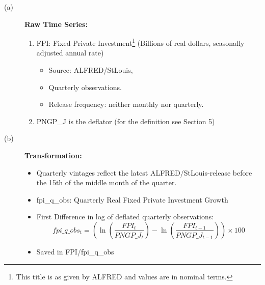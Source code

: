 \documentclass[3p,review,times]{elsarticle}		%
\begin{document}
\begin{description}
	\item[(a)] \textbf{Raw Time Series:}
	\begin{enumerate}
		\item FPI: Fixed Private Investment\footnote{This title is as given by ALFRED and values are in nominal terms.} (Billions of real dollars, seasonally adjusted annual rate)
		\begin{itemize}
			\item Source: ALFRED/StLouis,
			\item Quarterly observations.
			\item Release frequency: neither monthly nor quarterly.
		\end{itemize}
		\item PNGP\_J is the deflator (for the definition see Section 5)
	\end{enumerate}
	\item[(b)] \textbf{Transformation:}
	\begin{itemize}			
		\item Quarterly vintages reflect the latest ALFRED/StLouis-release before the 15th of the middle month of the quarter.
		\item fpi\_q\_obs: Quarterly Real Fixed Private Investment Growth
		\item First Difference in log of deflated quarterly observations:
		$$fpi\_q\_obs_{t}=\left(\ln\left(\frac{FPI_t}{PNGP\_J_t}\right)-\ln\left(\frac{FPI_{t-1}}{PNGP\_J_{t-1}}\right)\right)\times 100$$
		\item Saved in FPI/fpi\_q\_obs
	\end{itemize}
\end{description}
\end{document}
